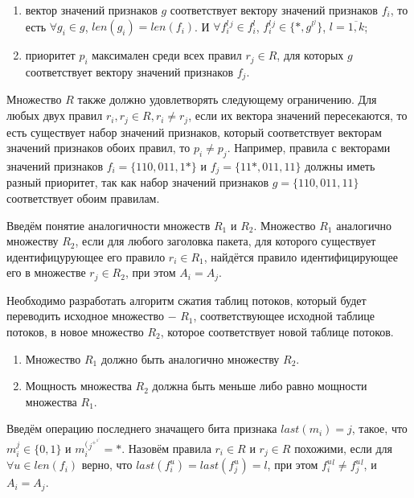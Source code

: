 \documentclass[a4peper, 12pt, titlepage, finall]{extreport}
\begin{document}
        \begin{enumerate}
            \item вектор значений признаков \(g\) соответствует вектору значений признаков \(f_i\), 
                то есть \(\forall g_i \in g\), \(len(g_i) = len(f_i)\). И \(\forall f_i^l^j \in f_i^l\), \(f_i^l^j \in \{*, g^l^j\}\), \(l=\overline{1,k}\);
            \item приоритет \(p_i\) максимален среди всех правил \(r_j\in R\), для которых \(g\) соответствует вектору значений признаков \(f_j\).
        \end{enumerate}

        Множество \(R\) также должно удовлетворять следующему ограничению. 
        Для любых двух правил \(r_i,r_j\in R,r_i\not= r_j\), если их вектора значений пересекаются, то есть существует набор значений признаков, 
        который соответствует векторам значений признаков обоих правил, то \(p_i\not= p_j\). 
        Например, правила с векторами значений признаков \(f_i=\{110, 011, 1*\}\) и \(f_j=\{11*, 011, 11\}\) должны иметь разный приоритет, 
        так как набор значений признаков \(g=\{110, 011, 11\}\) соответствует обоим правилам.

        Введём понятие аналогичности множеств \(R_1\) и \(R_2\).
        Множество \(R_1\) аналогично множеству \(R_2\), если для любого заголовка пакета, для которого существует идентифицурующее его правило \(r_i \in R_1\), 
        найдётся правило идентифицирующее его в множестве \(r_j \in R_2\), при этом \(A_i = A_j\).

        Необходимо разработать алгоритм сжатия таблиц потоков, который будет переводить исходное множество $-$ \(R_1\), соответствующее исходной таблице потоков, в
        новое множество \(R_2\), которое соответствует новой таблице потоков.
        \begin{enumerate}
            \item Множество \(R_1\) должно быть аналогично множеству \(R_2\).
            \item Мощность множества \(R_2\) должна быть меньше либо равно мощности множества \(R_1\).
        \end{enumerate}

        Введём операцию последнего значащего бита признака \(last(m_i) = j\), такое, что \(m_i^j \in \{0, 1\}\) и \(m_i^(^j^+^1^) = *\). 
        Назовём правила \(r_i \in R\) и \(r_j \in R\) похожими, 
        если для \(\forall u \in len(f_i)\) верно, что \(last(f_i^u) = last(f_j^u) = l\), при этом \(f_i^u^l \neq f_j^u^l\), и \(A_i = A_j\).
    \fi
\end{document}
